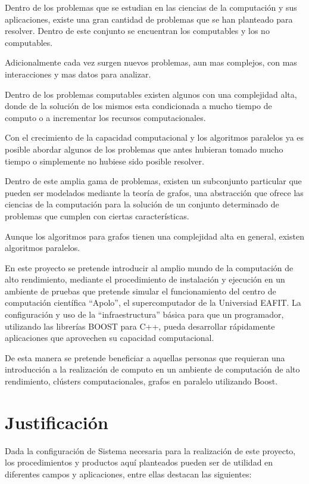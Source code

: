 Dentro de los problemas que se estudian en las ciencias de la computación y sus aplicaciones, existe una gran cantidad de problemas que se han planteado para resolver. Dentro de este conjunto se encuentran los computables y los no computables. 

Adicionalmente cada vez surgen nuevos problemas, aun mas complejos, con mas interacciones y mas datos para analizar. 

Dentro de los problemas computables existen algunos con una complejidad alta, donde de la solución de los mismos esta condicionada a mucho tiempo de computo o a incrementar los recursos computacionales.

 Con el crecimiento de la capacidad computacional y los algoritmos paralelos ya es posible abordar algunos de los problemas que antes hubieran tomado mucho tiempo o simplemente no hubiese sido posible resolver. 

Dentro de este amplia gama de problemas, existen un subconjunto particular que pueden ser modelados mediante la teoría de grafos, una  abstracción  que ofrece las ciencias de la computación para la solución de un conjunto determinado de problemas que cumplen con ciertas características. 

Aunque los algoritmos para grafos tienen una complejidad alta en general, existen algoritmos paralelos.

En este proyecto se pretende introducir al amplio mundo de la computación de alto rendimiento, mediante	el procedimiento de instalación y ejecución en un ambiente de pruebas que pretende simular el funcionamiento del centro de computación científica ``Apolo'', el supercomputador de la Universiad EAFIT. La configuración y uso de la ``infraestructura'' básica para que un programador, utilizando las librerías BOOST para C++, pueda desarrollar rápidamente aplicaciones que aprovechen su capacidad computacional. 

De esta manera se pretende beneficiar a aquellas personas que requieran una introducción a la realización de computo en un ambiente de computación de alto rendimiento, clústers computacionales, grafos en paralelo utilizando Boost.

\section{Justificación}

Dada la configuración de Sistema necesaria para la realización de este proyecto, los procedimientos y productos aquí planteados pueden ser de utilidad en diferentes campos y aplicaciones, entre ellas destacan las siguientes:  

